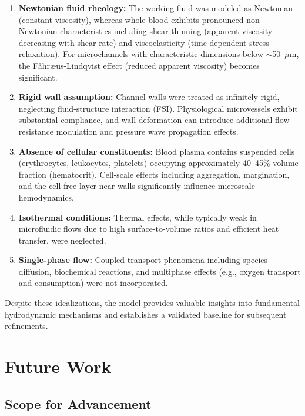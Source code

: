 \documentclass[12pt,a4paper]{article}
\begin{document}
\begin{enumerate}
  \item \textbf{Newtonian fluid rheology:} The working fluid was modeled as Newtonian (constant viscosity), whereas whole blood exhibits pronounced non-Newtonian characteristics including shear-thinning (apparent viscosity decreasing with shear rate) and viscoelasticity (time-dependent stress relaxation). For microchannels with characteristic dimensions below $\sim$50~$\mu$m, the Fåhræus-Lindqvist effect (reduced apparent viscosity) becomes significant.
  
  \item \textbf{Rigid wall assumption:} Channel walls were treated as infinitely rigid, neglecting fluid-structure interaction (FSI). Physiological microvessels exhibit substantial compliance, and wall deformation can introduce additional flow resistance modulation and pressure wave propagation effects.
  
  \item \textbf{Absence of cellular constituents:} Blood plasma contains suspended cells (erythrocytes, leukocytes, platelets) occupying approximately 40--45\% volume fraction (hematocrit). Cell-scale effects including aggregation, margination, and the cell-free layer near walls significantly influence microscale hemodynamics.
  
  \item \textbf{Isothermal conditions:} Thermal effects, while typically weak in microfluidic flows due to high surface-to-volume ratios and efficient heat transfer, were neglected.
  
  \item \textbf{Single-phase flow:} Coupled transport phenomena including species diffusion, biochemical reactions, and multiphase effects (e.g., oxygen transport and consumption) were not incorporated.
\end{enumerate}

Despite these idealizations, the model provides valuable insights into fundamental hydrodynamic mechanisms and establishes a validated baseline for subsequent refinements.

\section{Future Work}

\subsection{Scope for Advancement}
\end{document}
